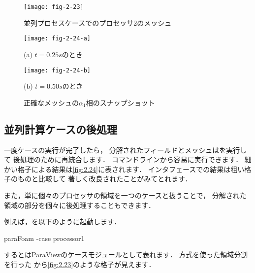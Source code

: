 \begin{figure}[ht]
 \texttt{[image: fig-2-23]}
 \caption{並列プロセスケースでのプロセッサ2のメッシュ}
 \label{fig:2.23}
\end{figure}


\begin{figure}[ht]
 \texttt{[image: fig-2-24-a]}\par
 (a) $t = 0.25\unit{s}$のとき\par
 \medskip
 \texttt{[image: fig-2-24-b]}\par
 (b) $t = 0.50\unit{s}$のとき
 \caption{正確なメッシュの$\alpha_{1}$相のスナップショット}
 \label{fig:2.24}
\end{figure}


\subsection{並列計算ケースの後処理}
\label{sssec:2.3.11}
一度ケースの実行が完了したら，
分解されたフィールドとメッシュはを実行して
後処理のために再統合します．
コマンドラインから容易に実行できます．
細かい格子による結果は\autoref{fig:2.24}に表されます．
インタフェースでの結果は粗い格子のものと比較して
著しく改良されたことがみてとれます．

また，単に個々のプロセッサの領域を一つのケースと扱うことで，
分解された領域の部分を個々に後処理することもできます．

例えば，を以下のように起動します．
\begin{OFverbatim}[terminal]
paraFoam -case processor1
\end{OFverbatim}
するとはParaViewのケースモジュールとして表れます．
方式を使った領域分割を行った
から\autoref{fig:2.23}のような格子が見えます．
